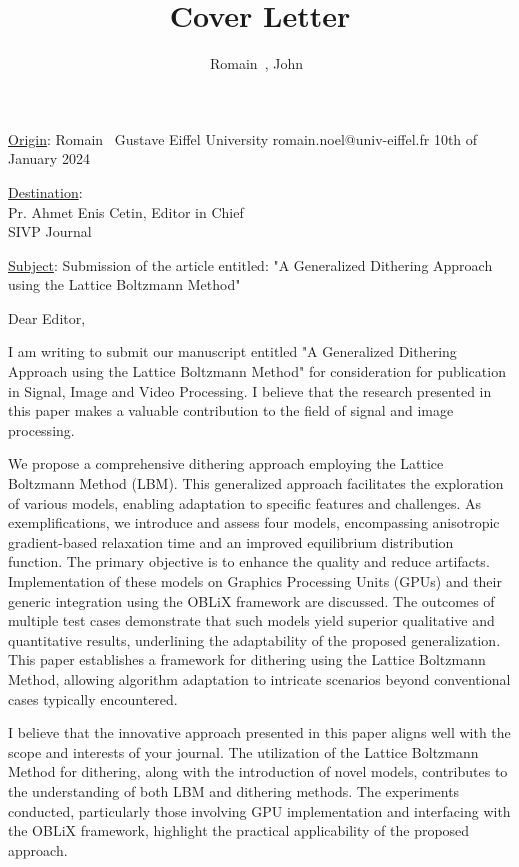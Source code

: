 \documentclass{article}
\title{Cover Letter}
\author{
	Romain~\famName{Noël}, John~\famName{Doe}
}
\begin{document}

	\begin{flushleft}
		\underline{Origin}:\newline
		Romain~ \newline
		Gustave Eiffel University \newline
		romain.noel@univ-eiffel.fr \newline
		10th of January 2024
	\end{flushleft}

	\begin{flushright}
		\underline{Destination}: \\
		Pr. Ahmet Enis Cetin, Editor in Chief \\
		SIVP Journal
	\end{flushright}

	\begin{center}
		\underline{Subject}: Submission of the article entitled: "A Generalized Dithering Approach using the Lattice Boltzmann Method"
	\end{center}


	Dear Editor,

	I am writing to submit our manuscript entitled "A Generalized Dithering Approach using the Lattice Boltzmann Method" for consideration for publication in {Signal, Image and Video Processing}.
	I believe that the research presented in this paper makes a valuable contribution to the field of {signal and image processing}.

	We propose a comprehensive dithering approach employing the Lattice Boltzmann Method (LBM).
	This generalized approach facilitates the exploration of various models, enabling adaptation to specific features and challenges.
	As exemplifications, we introduce and assess four models, encompassing anisotropic gradient-based relaxation time and an improved equilibrium distribution function.
	The primary objective is to enhance the quality and reduce artifacts.
	Implementation of these models on Graphics Processing Units (GPUs) and their generic integration using the OBLiX framework are discussed.
	The outcomes of multiple test cases demonstrate that such models yield superior qualitative and quantitative results, underlining the adaptability of the proposed generalization.
	This paper establishes a framework for dithering using the Lattice Boltzmann Method, allowing algorithm adaptation to intricate scenarios beyond conventional cases typically encountered.

	I believe that the innovative approach presented in this paper aligns well with the scope and interests of your journal.
	The utilization of the Lattice Boltzmann Method for dithering, along with the introduction of novel models, contributes to the understanding of both LBM and dithering methods.
	The experiments conducted, particularly those involving GPU implementation and interfacing with the OBLiX framework, highlight the practical applicability of the proposed approach.
\end{document}
